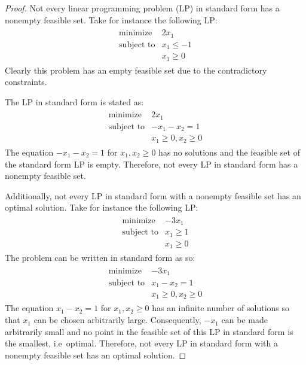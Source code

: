 \documentclass[12pt]{article}
\theoremstyle{definition}
\begin{document}
\begin{proof}
  Not every linear programming problem (LP) in standard form has a nonempty feasible set.
  Take for instance the following LP:
  \begin{align*}
    \begin{array}{rl}
      \text{minimize} & 2x_1 \\
      \text{subject to} & x_1 \leq -1 \\
      & x_1 \geq 0
    \end{array}
  \end{align*}
  Clearly this problem has an empty feasible set due to the contradictory constraints.

  The LP in standard form is stated as:
  \begin{align*}
    \begin{array}{rl}
      \text{minimize} & 2x_1  \\
      \text{subject to} & -x_1 - x_2  = 1  \\
      & x_1 \geq 0,  x_2 \geq 0
    \end{array}
  \end{align*}
  The equation $-x_1 - x_2 = 1$ for $x_1, x_2 \geq 0$ has no solutions
  and the feasible set of the standard form LP is empty.
  Therefore, not every LP in standard form has a nonempty feasible set.

  Additionally, not every LP in standard form with a nonempty feasible set has
  an optimal solution. Take for instance the following LP:
  \begin{align*}
    \begin{array}{rl}
      \text{minimize} & -3x_1 \\
      \text{subject to} & x_1 \geq 1  \\
      & x_1 \geq 0
    \end{array}
  \end{align*}
  The problem can be written in standard form as so:
  \begin{align*}
    \begin{array}{rl}
      \text{minimize} & -3x_1  \\
      \text{subject to} & x_1 - x_2 = 1  \\
      & x_1 \geq 0, x_2 \geq 0
    \end{array}
  \end{align*}
  The equation $x_1 - x_2 = 1$ for $x_1, x_2 \geq 0$ has an infinite number of
  solutions so that $x_1$ can be chosen arbitrarily large. Consequently,
  $-x_1$ can be made arbitrarily small and no point in
  the feasible set of this LP in standard form is the smallest, i.e\ optimal.
  Therefore, not every LP in standard form with a nonempty feasible set has an optimal solution.
\end{proof}
\newpage
\end{document}
